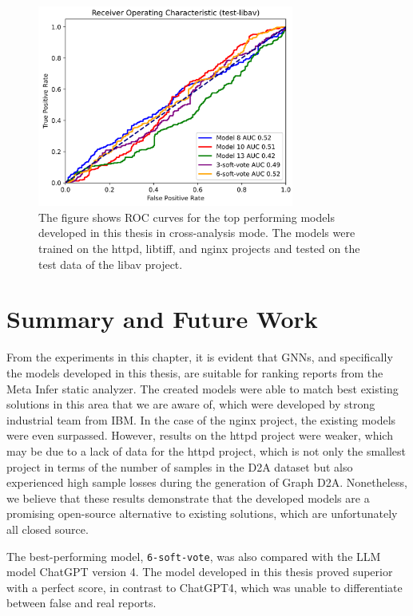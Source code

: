 \begin{figure}[t]
	\centering
	\includegraphics[width=0.75\textwidth]{figures/auc-libav.png}
	\caption{The figure shows ROC curves for the top performing models developed in this thesis in cross-analysis mode. The models were trained on the httpd, libtiff, and nginx projects and tested on the test data of the libav project.}
	\label{figure:auc-libav}
\end{figure}

\section{Summary and Future Work}
\label{summary}
From the experiments in this chapter, it is evident that GNNs, and specifically the models developed in this thesis, are suitable for ranking reports from the Meta Infer static analyzer. The created models were able to match best existing solutions in this area that we are aware of, which were developed by strong industrial team from IBM. In the case of the nginx project, the existing models were even surpassed. However, results on the httpd project were weaker, which may be due to a lack of data for the httpd project, which is not only the smallest project in terms of the number of samples in the D2A dataset but also experienced high sample losses during the generation of Graph D2A. Nonetheless, we believe that these results demonstrate that the developed models are a promising open-source alternative to existing solutions, which are unfortunately all closed source.

The best-performing model, \texttt{6-soft-vote}, was also compared with the LLM model ChatGPT version 4. The model developed in this thesis proved superior with a perfect score, in contrast to ChatGPT4, which was unable to differentiate between false and real reports.

